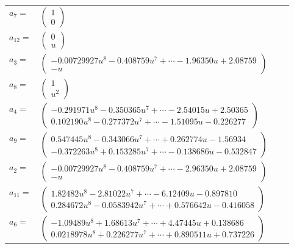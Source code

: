 \documentclass[1p]{elsarticle_modified}
\theoremstyle{definition}
\begin{document}
\begin{tabular}{m{7pt} m{180pt} m{7pt} m{180pt} }
\flushright $a_{7}=$&$\begin{pmatrix}1\\0\end{pmatrix}$ \\
\flushright $a_{12}=$&$\begin{pmatrix}0\\u\end{pmatrix}$ \\
\flushright $a_{3}=$&$\begin{pmatrix}-0.00729927 u^{8}-0.408759 u^{7}+\cdots-1.96350 u+2.08759\\- u\end{pmatrix}$ \\
\flushright $a_{8}=$&$\begin{pmatrix}1\\u^2\end{pmatrix}$ \\
\flushright $a_{4}=$&$\begin{pmatrix}-0.291971 u^{8}-0.350365 u^{7}+\cdots-2.54015 u+2.50365\\0.102190 u^{8}-0.277372 u^{7}+\cdots-1.51095 u-0.226277\end{pmatrix}$ \\
\flushright $a_{9}=$&$\begin{pmatrix}0.547445 u^{8}-0.343066 u^{7}+\cdots+0.262774 u-1.56934\\-0.372263 u^{8}+0.153285 u^{7}+\cdots-0.138686 u-0.532847\end{pmatrix}$ \\
\flushright $a_{2}=$&$\begin{pmatrix}-0.00729927 u^{8}-0.408759 u^{7}+\cdots-2.96350 u+2.08759\\- u\end{pmatrix}$ \\
\flushright $a_{11}=$&$\begin{pmatrix}1.82482 u^{8}-2.81022 u^{7}+\cdots-6.12409 u-0.897810\\0.284672 u^{8}-0.0583942 u^{7}+\cdots+0.576642 u-0.416058\end{pmatrix}$ \\
\flushright $a_{6}=$&$\begin{pmatrix}-1.09489 u^{8}+1.68613 u^{7}+\cdots+4.47445 u+0.138686\\0.0218978 u^{8}+0.226277 u^{7}+\cdots+0.890511 u+0.737226\end{pmatrix}$ \\

\end{tabular}
\end{document}

